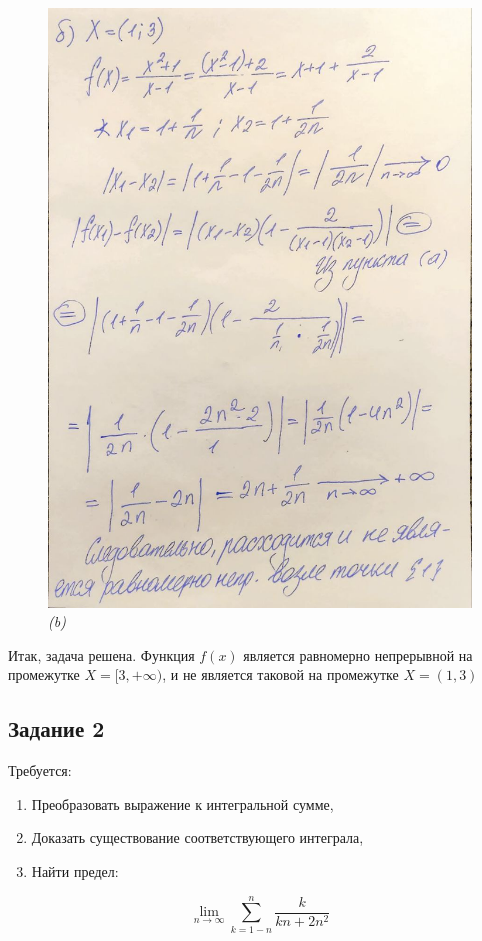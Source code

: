\documentclass[a4paper,12pt]{article}
\begin{document}
\begin{figure}[H]
    \centering
    \includegraphics[width=0.8\linewidth]{img/1_3.jpg}
    \caption{\emph{(b)}}
    \label{fig:part3}
\end{figure}

Итак, задача решена. Функция \( f(x) \) является равномерно непрерывной на промежутке \(X = [3,+\infty)\), и не является таковой на промежутке \( X = (1,3) \)


\newpage
\subsection{Задание 2}

Требуется:
\begin{enumerate}
    \item Преобразовать выражение к интегральной сумме,
    \item Доказать существование соответствующего интеграла,
    \item Найти предел:
\end{enumerate}

\[
\lim_{n \to \infty} \sum_{k=1 - n}^{n} \frac{k}{kn + 2n^2}
\]
\end{document}

